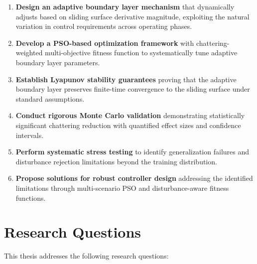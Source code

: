 \documentclass[12pt,a4paper,oneside]{report}
\begin{document}
\begin{enumerate}
\item \textbf{Design an adaptive boundary layer mechanism} that dynamically adjusts based on sliding surface derivative magnitude, exploiting the natural variation in control requirements across operating phases.

\item \textbf{Develop a PSO-based optimization framework} with chattering-weighted multi-objective fitness function to systematically tune adaptive boundary layer parameters.

\item \textbf{Establish Lyapunov stability guarantees} proving that the adaptive boundary layer preserves finite-time convergence to the sliding surface under standard assumptions.

\item \textbf{Conduct rigorous Monte Carlo validation} demonstrating statistically significant chattering reduction with quantified effect sizes and confidence intervals.

\item \textbf{Perform systematic stress testing} to identify generalization failures and disturbance rejection limitations beyond the training distribution.

\item \textbf{Propose solutions for robust controller design} addressing the identified limitations through multi-scenario PSO and disturbance-aware fitness functions.
\end{enumerate}

\section{Research Questions}

This thesis addresses the following research questions:
\end{document}
